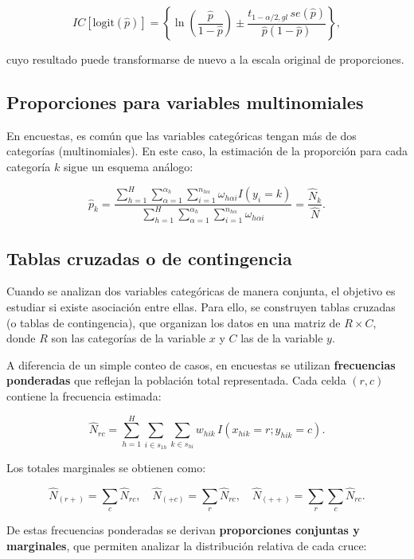 \documentclass[
  12pt,
]{book}
\begin{document}
\[
IC[\text{logit}(\hat{p})] = \left\{ \ln\left(\frac{\hat{p}}{1-\hat{p}}\right) \pm \frac{t_{1-\alpha/2,gl}\,se(\hat{p})}{\hat{p}(1-\hat{p})}\right\},
\]

cuyo resultado puede transformarse de nuevo a la escala original de proporciones.

\subsection{Proporciones para variables multinomiales}\label{proporciones-para-variables-multinomiales}

En encuestas, es común que las variables categóricas tengan más de dos categorías (multinomiales). En este caso, la estimación de la proporción para cada categoría \(k\) sigue un esquema análogo:

\[
\hat{p}_{k} = \frac{\sum_{h=1}^{H}\sum_{\alpha=1}^{\alpha_{h}}\sum_{i=1}^{n_{h\alpha}} \omega_{h\alpha i}I(y_{i}=k)}{\sum_{h=1}^{H}\sum_{\alpha=1}^{\alpha_{h}}\sum_{i=1}^{n_{h\alpha}} \omega_{h\alpha i}}
= \frac{\hat{N}_{k}}{\hat{N}}.
\]

\subsection{Tablas cruzadas o de contingencia}\label{tablas-cruzadas-o-de-contingencia}

Cuando se analizan dos variables categóricas de manera conjunta, el objetivo es estudiar si existe asociación entre ellas. Para ello, se construyen tablas cruzadas (o tablas de contingencia), que organizan los datos en una matriz de \(R \times C\), donde \(R\) son las categorías de la variable \(x\) y \(C\) las de la variable \(y\).

A diferencia de un simple conteo de casos, en encuestas se utilizan \textbf{frecuencias ponderadas} que reflejan la población total representada. Cada celda \((r,c)\) contiene la frecuencia estimada:

\[
\hat{N}_{rc} = \sum_{h=1}^{H}\sum_{i \in s_{1h}}\sum_{k \in s_{hi}} w_{hik}\,I(x_{hik}=r; y_{hik}=c).
\]

Los totales marginales se obtienen como:

\[
\hat{N}_{(r+)} = \sum_{c} \hat{N}_{rc}, \quad \hat{N}_{(+c)} = \sum_{r} \hat{N}_{rc}, \quad \hat{N}_{(++)} = \sum_{r}\sum_{c} \hat{N}_{rc}.
\]

De estas frecuencias ponderadas se derivan \textbf{proporciones conjuntas y marginales}, que permiten analizar la distribución relativa de cada cruce:
\end{document}
